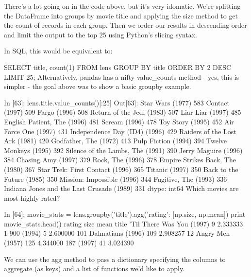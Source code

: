 There's a lot going on in the code above, but it's very idomatic. We're splitting the DataFrame into groups by movie title and applying the size method to get the count of records in each group. Then we order our results in descending order and limit the output to the top 25 using Python's slicing syntax.

In SQL, this would be equivalent to:

SELECT title, count(1)
FROM lens
GROUP BY title
ORDER BY 2 DESC
LIMIT 25;
Alternatively, pandas has a nifty value_counts method - yes, this is simpler - the goal above was to show a basic groupby example.

In [63]:
lens.title.value_counts()[:25]
Out[63]:
Star Wars (1977)                             583
Contact (1997)                               509
Fargo (1996)                                 508
Return of the Jedi (1983)                    507
Liar Liar (1997)                             485
English Patient, The (1996)                  481
Scream (1996)                                478
Toy Story (1995)                             452
Air Force One (1997)                         431
Independence Day (ID4) (1996)                429
Raiders of the Lost Ark (1981)               420
Godfather, The (1972)                        413
Pulp Fiction (1994)                          394
Twelve Monkeys (1995)                        392
Silence of the Lambs, The (1991)             390
Jerry Maguire (1996)                         384
Chasing Amy (1997)                           379
Rock, The (1996)                             378
Empire Strikes Back, The (1980)              367
Star Trek: First Contact (1996)              365
Titanic (1997)                               350
Back to the Future (1985)                    350
Mission: Impossible (1996)                   344
Fugitive, The (1993)                         336
Indiana Jones and the Last Crusade (1989)    331
dtype: int64
Which movies are most highly rated?

In [64]:
movie_stats = lens.groupby('title').agg({'rating': [np.size, np.mean]})
print movie_stats.head()
                           rating          
                             size      mean
title                                      
'Til There Was You (1997)       9  2.333333
1-900 (1994)                    5  2.600000
101 Dalmatians (1996)         109  2.908257
12 Angry Men (1957)           125  4.344000
187 (1997)                     41  3.024390

We can use the agg method to pass a dictionary specifying the columns to aggregate (as keys) and a list of functions we'd like to apply.

